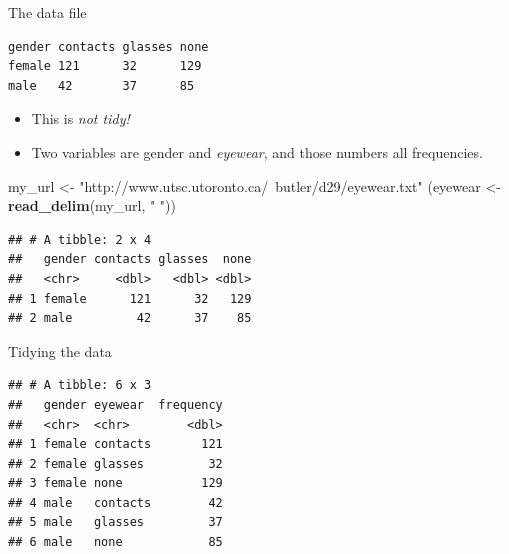 \documentclass[ignorenonframetext,]{beamer}
\newenvironment{Shaded}{\begin{snugshade}}{\end{snugshade}}
\newcommand{\DataTypeTok}[1]{\textcolor[rgb]{0.13,0.29,0.53}{#1}}
\newcommand{\KeywordTok}[1]{\textcolor[rgb]{0.13,0.29,0.53}{\textbf{#1}}}
\newcommand{\NormalTok}[1]{#1}
\newcommand{\OperatorTok}[1]{\textcolor[rgb]{0.81,0.36,0.00}{\textbf{#1}}}
\newcommand{\StringTok}[1]{\textcolor[rgb]{0.31,0.60,0.02}{#1}}
\begin{document}
\begin{frame}[fragile]{The data file}
\protect\hypertarget{the-data-file}{}

\footnotesize

\begin{verbatim}
gender contacts glasses none
female 121      32      129
male   42       37      85
\end{verbatim}

\normalsize

\begin{itemize}
\item
  This is \emph{not tidy!}
\item
  Two variables are gender and \emph{eyewear}, and those numbers all
  frequencies.
\end{itemize}

\footnotesize

\begin{Shaded}
\begin{Highlighting}[]
\NormalTok{my_url <-}\StringTok{ "http://www.utsc.utoronto.ca/~butler/d29/eyewear.txt"}
\NormalTok{(eyewear <-}\StringTok{ }\KeywordTok{read_delim}\NormalTok{(my_url, }\StringTok{" "}\NormalTok{))}
\end{Highlighting}
\end{Shaded}

\begin{verbatim}
## # A tibble: 2 x 4
##   gender contacts glasses  none
##   <chr>     <dbl>   <dbl> <dbl>
## 1 female      121      32   129
## 2 male         42      37    85
\end{verbatim}

\normalsize

\end{frame}

\begin{frame}[fragile]{Tidying the data}
\protect\hypertarget{tidying-the-data}{}

\begin{Shaded}
\end{Shaded}

\begin{verbatim}
## # A tibble: 6 x 3
##   gender eyewear  frequency
##   <chr>  <chr>        <dbl>
## 1 female contacts       121
## 2 female glasses         32
## 3 female none           129
## 4 male   contacts        42
## 5 male   glasses         37
## 6 male   none            85
\end{verbatim}

\end{frame}
\end{document}

